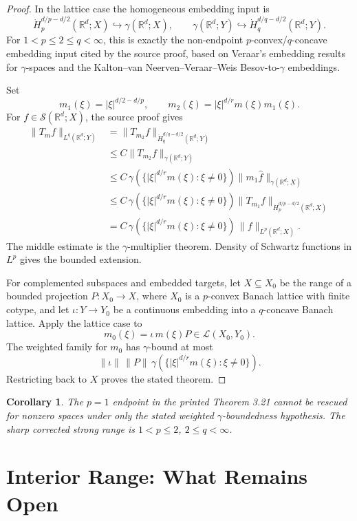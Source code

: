\documentclass[11pt]{article}
\newtheorem{corollary}{Corollary}
\newcommand{\R}{\mathbb R}
\newcommand{\cL}{\mathcal L}
\begin{document}
\begin{proof}
In the lattice case the homogeneous embedding input is
\[
  \dot H_p^{d/p-d/2}(\R^d;X)\hookrightarrow \gamma(\R^d;X),
  \qquad
  \gamma(\R^d;Y)\hookrightarrow \dot H_q^{d/q-d/2}(\R^d;Y).
\]
For \(1<p\le2\le q<\infty\), this is exactly the non-endpoint \(p\)-convex/\(q\)-concave embedding input cited by the source proof, based on Veraar's embedding results for \(\gamma\)-spaces and the Kalton--van Neerven--Veraar--Weis Besov-to-\(\gamma\) embeddings.

Set
\[
  m_1(\xi)=|\xi|^{d/2-d/p},\qquad
  m_2(\xi)=|\xi|^{d/r}m(\xi)m_1(\xi).
\]
For \(f\in\mathcal S(\R^d;X)\), the source proof gives
\begin{align*}
\|T_m f\|_{L^q(\R^d;Y)}
&= \|T_{m_2}f\|_{\dot H_q^{d/q-d/2}(\R^d;Y)}\\
&\le C\|T_{m_2}f\|_{\gamma(\R^d;Y)}\\
&\le C\,\gamma(\{|\xi|^{d/r}m(\xi):\xi\ne0\})
       \|m_1\widehat f\|_{\gamma(\R^d;X)}\\
&\le C\,\gamma(\{|\xi|^{d/r}m(\xi):\xi\ne0\})
       \|T_{m_1}f\|_{\dot H_p^{d/p-d/2}(\R^d;X)}\\
&= C\,\gamma(\{|\xi|^{d/r}m(\xi):\xi\ne0\})\,\|f\|_{L^p(\R^d;X)}.
\end{align*}
The middle estimate is the \(\gamma\)-multiplier theorem.  Density of Schwartz functions in \(L^p\) gives the bounded extension.

For complemented subspaces and embedded targets, let \(X\subseteq X_0\) be the range of a bounded projection \(P:X_0\to X\), where \(X_0\) is a \(p\)-convex Banach lattice with finite cotype, and let \(\iota:Y\to Y_0\) be a continuous embedding into a \(q\)-concave Banach lattice.  Apply the lattice case to
\[
  m_0(\xi)=\iota\,m(\xi)P\in\cL(X_0,Y_0).
\]
The weighted family for \(m_0\) has \(\gamma\)-bound at most
\[
  \|\iota\|\,\|P\|\,
  \gamma(\{|\xi|^{d/r}m(\xi):\xi\ne0\}).
\]
Restricting back to \(X\) proves the stated theorem.
\end{proof}

\begin{corollary}
The \(p=1\) endpoint in the printed Theorem 3.21 cannot be rescued for nonzero spaces under only the stated weighted \(\gamma\)-boundedness hypothesis.  The sharp corrected strong range is \(1<p\le2\), \(2\le q<\infty\).
\end{corollary}

\section*{Interior Range: What Remains Open}
\end{document}
